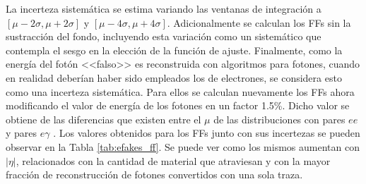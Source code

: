 La incerteza sistemática se estima variando las ventanas de integración a $[\mu - 2\sigma, \mu + 2\sigma]$ y $[\mu - 4\sigma, \mu + 4\sigma]$. Adicionalmente se calculan los FFs sin la sustracción del fondo, incluyendo esta variación como un sistemático que contempla el sesgo en la elección de la función de ajuste. Finalmente, como la energía del fotón <<falso>> es reconstruida con algoritmos para fotones, cuando en realidad deberían haber sido empleados los de electrones, se considera esto como una incerteza sistemática. Para ellos se calculan nuevamente los FFs ahora modificando el valor de energía de los fotones en un factor 1.5\%. Dicho valor se obtiene de las diferencias que existen entre el $\mu$ de las distribuciones con pares $ee$ y pares $e\gamma$ \cite{EXOT-2016-32}. Los valores obtenidos para los FFs junto con sus incertezas se pueden observar en la Tabla \ref{tab:efakes_ff}. Se puede ver como los mismos aumentan con $|\eta|$, relacionados con la cantidad de material que atraviesan y con la mayor fracción de reconstrucción de fotones convertidos con una sola traza.


\begin{table}
\centering
\caption{Factores de reconstrucción errónea de electrones como fotones en función de $|\eta|$ para todos los datos del Run 2. Se muestran explícitas las incertezas estadísticas y sistemáticas provenientes de variar la ventana de integración, no emplear la sustracción de fondo y el sesgo en la energía de los fotones.}
\label{tab:efakes_ff}
\end{table}



